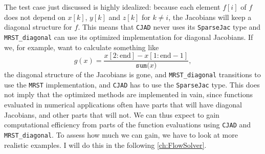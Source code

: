 The test case just discussed is highly idealized: because each element $f[i]$ of $f$ does not depend on $x[k]$, $y[k]$ and $z[k]$ for $k\not=i$, the Jacobians will keep a diagonal structure for $f$. This means that \texttt{CJAD} never uses its \texttt{SparseJac} type and \texttt{MRST\_diagonal} can use its optimized implementation for diagonal Jacobians. If we, for example, want to calculate something like
\begin{equation*}
g(x) = \frac{x\left[2:\text{end}\right] - x\left[1:\text{end}-1\right]}{\texttt{sum(}x\texttt{)}},
\end{equation*}
the diagonal structure of the Jacobians is gone, and \texttt{MRST\_diagonal} transitions to use the \texttt{MRST} implementation, and \texttt{CJAD} has to use the \texttt{SparseJac} type. This does not imply that the optimized methods are implemented in vain, since functions evaluated in numerical applications often have parts that will have diagonal Jacobians, and other parts that will not. We can thus expect to gain computational efficiency from parts of the function evaluations using \texttt{CJAD} and \texttt{MRST\_diagonal}. To assess how much we can gain, we have to look at more realistic examples. I will do this in the following \autoref{ch:FlowSolver}. 

